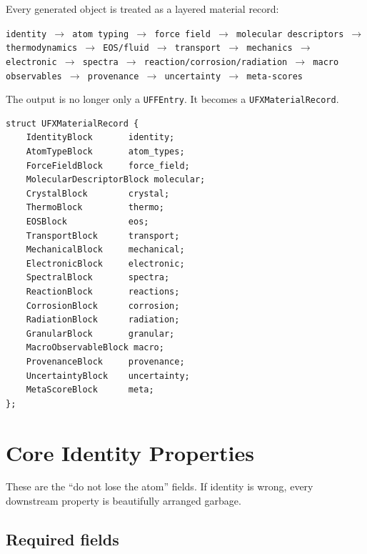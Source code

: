 \documentclass[11pt, a4paper]{article}
\begin{document}
Every generated object is treated as a layered material record:

\begin{center}
\texttt{identity $\rightarrow$ atom typing $\rightarrow$ force field $\rightarrow$ molecular descriptors $\rightarrow$ thermodynamics $\rightarrow$ EOS/fluid $\rightarrow$ transport $\rightarrow$ mechanics $\rightarrow$ electronic $\rightarrow$ spectra $\rightarrow$ reaction/corrosion/radiation $\rightarrow$ macro observables $\rightarrow$ provenance $\rightarrow$ uncertainty $\rightarrow$ meta-scores}
\end{center}

The output is no longer only a \texttt{UFFEntry}. It becomes a \texttt{UFXMaterialRecord}.

\begin{lstlisting}
struct UFXMaterialRecord {
    IdentityBlock       identity;
    AtomTypeBlock       atom_types;
    ForceFieldBlock     force_field;
    MolecularDescriptorBlock molecular;
    CrystalBlock        crystal;
    ThermoBlock         thermo;
    EOSBlock            eos;
    TransportBlock      transport;
    MechanicalBlock     mechanical;
    ElectronicBlock     electronic;
    SpectralBlock       spectra;
    ReactionBlock       reactions;
    CorrosionBlock      corrosion;
    RadiationBlock      radiation;
    GranularBlock       granular;
    MacroObservableBlock macro;
    ProvenanceBlock     provenance;
    UncertaintyBlock    uncertainty;
    MetaScoreBlock      meta;
};
\end{lstlisting}

\section{Core Identity Properties}

These are the ``do not lose the atom'' fields. If identity is wrong, every downstream property is beautifully arranged garbage.

\subsection{Required fields}
\end{document}

